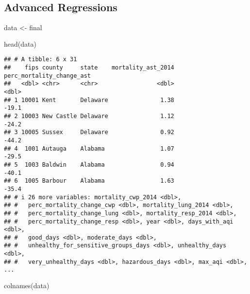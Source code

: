 \documentclass[
]{article}
\newenvironment{Shaded}{\begin{snugshade}}{\end{snugshade}}
\newcommand{\FunctionTok}[1]{\textcolor[rgb]{0.00,0.00,0.00}{#1}}
\newcommand{\NormalTok}[1]{#1}
\newcommand{\OtherTok}[1]{\textcolor[rgb]{0.56,0.35,0.01}{#1}}
\begin{document}
\hypertarget{advanced-regressions}{%
\subsection{Advanced Regressions}\label{advanced-regressions}}

\begin{Shaded}
\begin{Highlighting}[]
\NormalTok{data }\OtherTok{\textless{}{-}}\NormalTok{ final}
\end{Highlighting}
\end{Shaded}

\begin{Shaded}
\begin{Highlighting}[]
\FunctionTok{head}\NormalTok{(data)}
\end{Highlighting}
\end{Shaded}

\begin{verbatim}
## # A tibble: 6 x 31
##    fips county     state    mortality_ast_2014 perc_mortality_change_ast
##   <dbl> <chr>      <chr>                 <dbl>                     <dbl>
## 1 10001 Kent       Delaware               1.38                     -19.1
## 2 10003 New Castle Delaware               1.12                     -24.2
## 3 10005 Sussex     Delaware               0.92                     -44.2
## 4  1001 Autauga    Alabama                1.07                     -29.5
## 5  1003 Baldwin    Alabama                0.94                     -40.1
## 6  1005 Barbour    Alabama                1.63                     -35.4
## # i 26 more variables: mortality_cwp_2014 <dbl>,
## #   perc_mortality_change_cwp <dbl>, mortality_lung_2014 <dbl>,
## #   perc_mortality_change_lung <dbl>, mortality_resp_2014 <dbl>,
## #   perc_mortality_change_resp <dbl>, year <dbl>, days_with_aqi <dbl>,
## #   good_days <dbl>, moderate_days <dbl>,
## #   unhealthy_for_sensitive_groups_days <dbl>, unhealthy_days <dbl>,
## #   very_unhealthy_days <dbl>, hazardous_days <dbl>, max_aqi <dbl>, ...
\end{verbatim}

\begin{Shaded}
\begin{Highlighting}[]
\FunctionTok{colnames}\NormalTok{(data)}
\end{Highlighting}
\end{Shaded}
\end{document}
